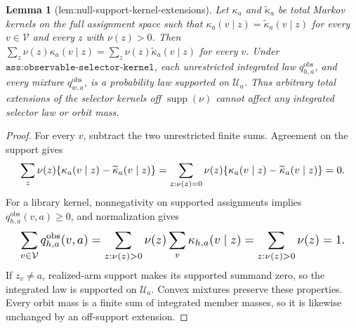 \documentclass{article}
\newtheorem{lemma}{Lemma}
\begin{document}
\begin{lemma}[lem:null-support-kernel-extensions]\label{lem:null-support-kernel-extensions}
Let \(\kappa_a\) and \(\widetilde\kappa_a\) be total Markov kernels on the full assignment space such that \(\kappa_a(v\mid z)=\widetilde\kappa_a(v\mid z)\) for every \(v\in\mathcal V\) and every \(z\) with \(\nu(z)>0\). Then \(\sum_z\nu(z)\kappa_a(v\mid z)=\sum_z\nu(z)\widetilde\kappa_a(v\mid z)\) for every \(v\). Under \(\texttt{ass:observable-selector-kernel}\), each unrestricted integrated law \(q^{\mathrm{obs}}_{h,a}\), and every mixture \(q^{\mathrm{obs}}_{w,a}\), is a probability law supported on \(\mathcal U_a\). Thus arbitrary total extensions of the selector kernels off \(\operatorname{supp}(\nu)\) cannot affect any integrated selector law or orbit mass.
\end{lemma}
\begin{proof}
For every \(v\), subtract the two unrestricted finite sums. Agreement on the support gives \[
\makebox[\linewidth][c]{\resizebox{0.98\linewidth}{!}{\par\noindent \makebox[\linewidth][c]{\resizebox{0.98\linewidth}{!}{\(\displaystyle \displaystyle \sum_z\nu(z)\{\kappa_a(v\mid z)-\widetilde\kappa_a(v\mid z)\}=\sum_{z:\nu(z)=0}\nu(z)\{\kappa_a(v\mid z)-\widetilde\kappa_a(v\mid z)\}=0.\)}}\par\noindent}}
\] For a library kernel, nonnegativity on supported assignments implies \(q^{\mathrm{obs}}_{h,a}(v,a)\ge0\), and normalization gives \[
\makebox[\linewidth][c]{\resizebox{0.98\linewidth}{!}{\par\noindent \makebox[\linewidth][c]{\resizebox{0.98\linewidth}{!}{\(\displaystyle \displaystyle \sum_{v\in\mathcal V}q^{\mathrm{obs}}_{h,a}(v,a)=\sum_{z:\nu(z)>0}\nu(z)\sum_v\kappa_{h,a}(v\mid z)=\sum_{z:\nu(z)>0}\nu(z)=1.\)}}\par\noindent}}
\] If \(z_v\ne a\), realized-arm support makes its supported summand zero, so the integrated law is supported on \(\mathcal U_a\). Convex mixtures preserve these properties. Every orbit mass is a finite sum of integrated member masses, so it is likewise unchanged by an off-support extension.
\end{proof}
\end{document}
